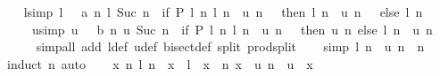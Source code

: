 \begin{isabellebody}
\ \ \isamarkupfalse%
\ l{\isacharbrackleft}{\kern0pt}simp{\isacharbrackright}{\kern0pt}{\isacharcolon}{\kern0pt}\ {\isachardoublequoteopen}l\ {}\ {\isacharequal}{\kern0pt}\ a{\isachardoublequoteclose}\ {\isachardoublequoteopen}{\isasymAnd}n{\isachardot}{\kern0pt}\ l\ {\isacharparenleft}{\kern0pt}Suc\ n{\isacharparenright}{\kern0pt}\ {\isacharequal}{\kern0pt}\ {\isacharparenleft}{\kern0pt}if\ P\ {\isacharparenleft}{\kern0pt}l\ n{\isacharparenright}{\kern0pt}\ {\isacharparenleft}{\kern0pt}{\isacharparenleft}{\kern0pt}l\ n\ {\isacharplus}{\kern0pt}\ u\ n{\isacharparenright}{\kern0pt}\ {\isacharslash}{\kern0pt}\ {}{\isacharparenright}{\kern0pt}\ then\ {\isacharparenleft}{\kern0pt}l\ n\ {\isacharplus}{\kern0pt}\ u\ n{\isacharparenright}{\kern0pt}\ {\isacharslash}{\kern0pt}\ {}\ else\ l\ n{\isacharparenright}{\kern0pt}{\isachardoublequoteclose}\isanewline
\ \ \ \ \ u{\isacharbrackleft}{\kern0pt}simp{\isacharbrackright}{\kern0pt}{\isacharcolon}{\kern0pt}\ {\isachardoublequoteopen}u\ {}\ {\isacharequal}{\kern0pt}\ b{\isachardoublequoteclose}\ {\isachardoublequoteopen}{\isasymAnd}n{\isachardot}{\kern0pt}\ u\ {\isacharparenleft}{\kern0pt}Suc\ n{\isacharparenright}{\kern0pt}\ {\isacharequal}{\kern0pt}\ {\isacharparenleft}{\kern0pt}if\ P\ {\isacharparenleft}{\kern0pt}l\ n{\isacharparenright}{\kern0pt}\ {\isacharparenleft}{\kern0pt}{\isacharparenleft}{\kern0pt}l\ n\ {\isacharplus}{\kern0pt}\ u\ n{\isacharparenright}{\kern0pt}\ {\isacharslash}{\kern0pt}\ {}{\isacharparenright}{\kern0pt}\ then\ u\ n\ else\ {\isacharparenleft}{\kern0pt}l\ n\ {\isacharplus}{\kern0pt}\ u\ n{\isacharparenright}{\kern0pt}\ {\isacharslash}{\kern0pt}\ {}{\isacharparenright}{\kern0pt}{\isachardoublequoteclose}\isanewline
\ \ \ \ \isamarkupfalse%
\ {\isacharparenleft}{\kern0pt}simp{\isacharunderscore}{\kern0pt}all\ add{\isacharcolon}{\kern0pt}\ l{\isacharunderscore}{\kern0pt}def\ u{\isacharunderscore}{\kern0pt}def\ bisect{\isacharunderscore}{\kern0pt}def\ split{\isacharcolon}{\kern0pt}\ prod{\isachardot}{\kern0pt}split{\isacharparenright}{\kern0pt}\isanewline
\isanewline
\ \ \isamarkupfalse%
\ {\isacharbrackleft}{\kern0pt}simp{\isacharbrackright}{\kern0pt}{\isacharcolon}{\kern0pt}\ {\isachardoublequoteopen}l\ n\ {\isasymle}\ u\ n{\isachardoublequoteclose}\ \ n\ \isamarkupfalse%
\ {\isacharparenleft}{\kern0pt}induct\ n{\isacharparenright}{\kern0pt}\ auto\isanewline
\isanewline
\ \ \isamarkupfalse%
\ {\isachardoublequoteopen}{\isasymexists}x{\isachardot}{\kern0pt}\ {\isacharparenleft}{\kern0pt}{\isacharparenleft}{\kern0pt}{\isasymforall}n{\isachardot}{\kern0pt}\ l\ n\ {\isasymle}\ x{\isacharparenright}{\kern0pt}\ {\isasymand}\ l\ {\isasymlonglonglongrightarrow}\ x{\isacharparenright}{\kern0pt}\ {\isasymand}\ {\isacharparenleft}{\kern0pt}{\isacharparenleft}{\kern0pt}{\isasymforall}n{\isachardot}{\kern0pt}\ x\ {\isasymle}\ u\ n{\isacharparenright}{\kern0pt}\ {\isasymand}\ u\ {\isasymlonglonglongrightarrow}\ x{\isacharparenright}{\kern0pt}{\isachardoublequoteclose}\isanewline

\end{isabellebody}
